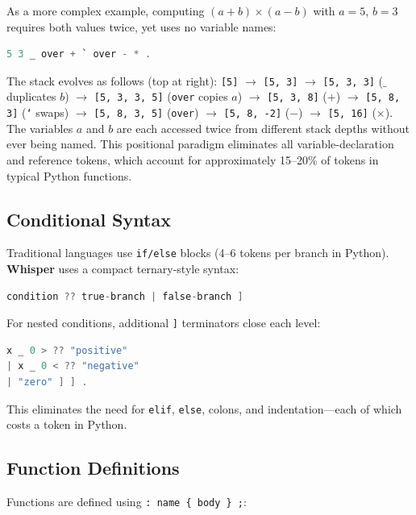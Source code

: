 \documentclass[11pt,a4paper]{article}
\begin{document}
As a more complex example, computing $(a + b) \times (a - b)$ with $a = 5$,
$b = 3$ requires both values twice, yet uses no variable names:

\begin{lstlisting}[language=C,basicstyle=\ttfamily\small]
5 3 _ over + ` over - * .
\end{lstlisting}

The stack evolves as follows (top at right):
\texttt{[5]} $\rightarrow$ \texttt{[5, 3]} $\rightarrow$ \texttt{[5, 3, 3]}
($\_$ duplicates $b$) $\rightarrow$ \texttt{[5, 3, 3, 5]} (\texttt{over} copies
$a$) $\rightarrow$ \texttt{[5, 3, 8]} ($+$) $\rightarrow$ \texttt{[5, 8, 3]}
(\texttt{`} swaps) $\rightarrow$ \texttt{[5, 8, 3, 5]} (\texttt{over})
$\rightarrow$ \texttt{[5, 8, -2]} ($-$) $\rightarrow$ \texttt{[5, 16]}
($\times$). The variables $a$ and $b$ are each accessed twice from different
stack depths without ever being named. This positional paradigm eliminates
all variable-declaration and reference tokens, which account for
approximately 15--20\% of tokens in typical Python functions.

\subsection{Conditional Syntax}

Traditional languages use \texttt{if/else} blocks (4--6 tokens per branch in
Python). \textbf{Whisper} uses a compact ternary-style syntax:

\begin{lstlisting}[language=C,basicstyle=\ttfamily\small]
condition ?? true-branch | false-branch ]
\end{lstlisting}

For nested conditions, additional \texttt{]} terminators close each level:

\begin{lstlisting}[language=C,basicstyle=\ttfamily\small]
x _ 0 > ?? "positive"
| x _ 0 < ?? "negative"
| "zero" ] ] .
\end{lstlisting}

This eliminates the need for \texttt{elif}, \texttt{else}, colons, and
indentation---each of which costs a token in Python.

\subsection{Function Definitions}

Functions are defined using \texttt{: name \{ body \} ;}:
\end{document}
